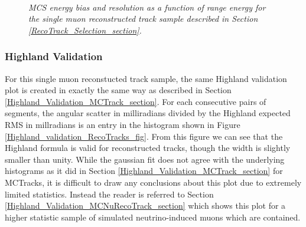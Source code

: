 \begin{figure}
\centering
\mbox{
	\quad
	}
\caption{\textit{MCS energy bias and resolution as a function of range energy for the single muon reconstructed track sample described in Section \ref{RecoTrack_Selection_section}.}}
\label{MCS_range_bias_resolution_RecoTrack_fig}
\end{figure}



\subsubsection{Highland Validation}\label{Highland_Validation_RecoTrack_section}
For this single muon reconstucted track sample, the same Highland validation plot is created in exactly the same way as described in Section \ref{Highland_Validation_MCTrack_section}. For each consecutive pairs of segments, the angular scatter in milliradians divided by the Highland expected RMS in millradians is an entry in the histogram shown in Figure \ref{Highland_validation_RecoTracks_fig}. From this figure we can see that the Highland formula is valid for reconstructed tracks, though the width is slightly smaller than unity. While the gaussian fit does not agree with the underlying histograms as it did in Section \ref{Highland_Validation_MCTrack_section} for {\sc MCTracks}, it is difficult to draw any conclusions about this plot due to extremely limited statistics. Instead the reader is referred to Section \ref{Highland_Validation_MCNuRecoTrack_section} which shows this plot for a higher statistic sample of simulated neutrino-induced muons which are contained.

